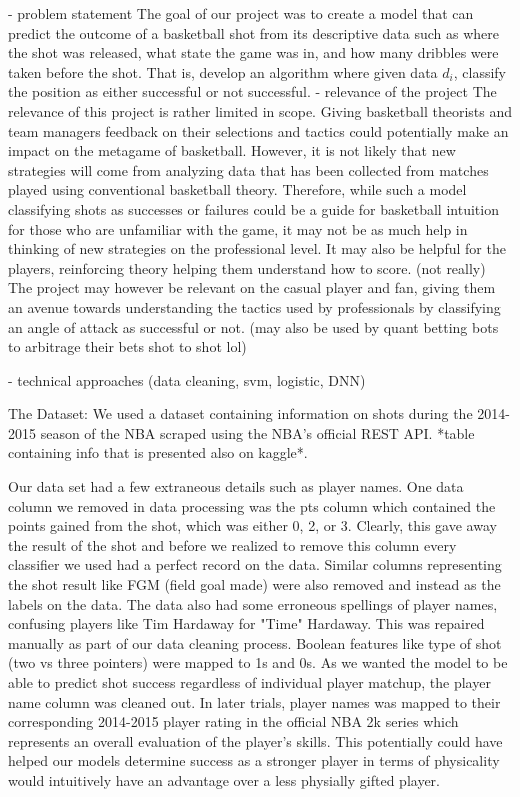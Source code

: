 \documentclass[12pt]{article}
\begin{document}
- problem statement
The goal of our project was to create a model that can predict the outcome of a basketball shot from its descriptive data such as where the shot was released, what state the game was in, and how many dribbles were taken before the shot. That is, develop an algorithm where given data $d_i$, classify the position as either successful or not successful.
- relevance of the project
The relevance of this project is rather limited in scope. Giving basketball theorists and team managers feedback on their selections and tactics could potentially make an impact on the metagame of basketball. However, it is not likely that new strategies will come from analyzing data that has been collected from matches played using conventional basketball theory. Therefore, while such a model classifying shots as successes or failures could be a guide for basketball intuition for those who are unfamiliar with the game, it may not be as much help in thinking of new strategies on the professional level. It may also be helpful for the players, reinforcing theory helping them understand how to score. (not really)
The project may however be relevant on the casual player and fan, giving them an avenue towards understanding the tactics used by professionals by classifying an angle of attack as successful or not.
(may also be used by quant betting bots to arbitrage their bets shot to shot lol)

- technical approaches (data cleaning, svm, logistic, DNN)

The Dataset:
We used a dataset containing information on shots during the 2014-2015 season of the NBA scraped using the NBA's official REST API. *table containing info that is presented also on kaggle*.

Our data set had a few extraneous details such as player names. One data column we removed in data processing was the pts column which contained the points gained from the shot, which was either 0, 2, or 3. Clearly, this gave away the result of the shot and before we realized to remove this column every classifier we used had a perfect record on the data. Similar columns representing the shot result like FGM (field goal made) were also removed and instead as the labels on the data. The data also had some erroneous spellings of player names, confusing players like Tim Hardaway for "Time" Hardaway. This was repaired manually as part of our data cleaning process. Boolean features like type of shot (two vs three pointers) were mapped to 1s and 0s. As we wanted the model to be able to predict shot success regardless of individual player matchup, the player name column was cleaned out.
In later trials, player names was mapped to their corresponding 2014-2015 player rating in the official NBA 2k series which represents an overall evaluation of the player's skills. This potentially could have helped our models determine success as a stronger player in terms of physicality would intuitively have an advantage over a less physially gifted player.
\end{document}
